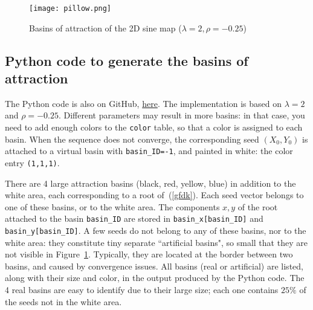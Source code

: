 \documentclass[oneside,10pt]{book}
\begin{document}
\begin{figure}%
\centering
\texttt{[image: pillow.png]}  %
\caption{Basins of attraction of the 2D sine map ($\lambda=2,\rho=-0.25$)}
\label{fig:rheypll}
\end{figure}

\subsection{Python code to generate the basins of attraction}\label{pytgr}

The Python code is also on GitHub, \href{https://github.com/VincentGranville/Stochastic-Processes/blob/master/basin.py}{here}.
The implementation is based on $\lambda=2$ and $\rho=-0.25$. Different parameters may result in more basins: in that case, you need to
add enough colors to the \texttt{color} table, so that a color is assigned to each basin. When the sequence does not converge,
 the corresponding seed $(X_0,Y_0)$ is attached to a virtual basin with \texttt{basin\_ID=-1}, and
 painted in white: the color entry \texttt{(1,1,1)}.

There are 4 large attraction basins (black, red, yellow, blue) in addition to the white area, each corresponding to a root of~(\ref{gfdk}).
 Each seed vector belongs to one of these basins, or to the white area.
 The components $x,y$ of the root attached to the basin \texttt{basin\_ID}
are stored in \texttt{basin\_x[basin\_ID]} and \texttt{basin\_y[basin\_ID]}.
A few seeds do not belong to any of these basins, nor to
 the white area: they constitute tiny separate ``artificial basins", so small that they are not visible in Figure~\ref{fig:rheypll}. Typically,
 they are located at the border between two basins, and caused by convergence issues. All basins (real or artificial) are listed, along with their size and color,  in the output produced
 by the Python code. The 4 real basins are easy to identify due to their large size; each one contains $25\%$ of the seeds not in the white area.
\vspace{1ex}
\end{document}
